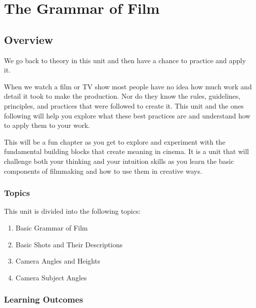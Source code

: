 \documentclass[
]{book}
\providecommand{\tightlist}{%
  \setlength{\itemsep}{0pt}\setlength{\parskip}{0pt}}
\begin{document}
\hypertarget{the-grammar-of-film}{%
\chapter{The Grammar of Film}\label{the-grammar-of-film}}

\hypertarget{overview-4}{%
\section*{Overview}\label{overview-4}}

We go back to theory in this unit and then have a chance to practice and apply it.

When we watch a film or TV show most people have no idea how much work and detail it took to make the production. Nor do they know the rules, guidelines, principles, and practices that were followed to create it. This unit and the ones following will help you explore what these best practices are and understand how to apply them to your work.

This will be a fun chapter as you get to explore and experiment with the fundamental building blocks that create meaning in cinema. It is a unit that will challenge both your thinking and your intuition skills as you learn the basic components of filmmaking and how to use them in creative ways.

\hypertarget{topics-4}{%
\subsection*{Topics}\label{topics-4}}

This unit is divided into the following topics:

\begin{enumerate}
\def\labelenumi{\arabic{enumi}.}
\tightlist
\item
  Basic Grammar of Film\\
\item
  Basic Shots and Their Descriptions\\
\item
  Camera Angles and Heights\\
\item
  Camera Subject Angles
\end{enumerate}

\hypertarget{learning-outcomes-4}{%
\subsection*{Learning Outcomes}\label{learning-outcomes-4}}
\end{document}
